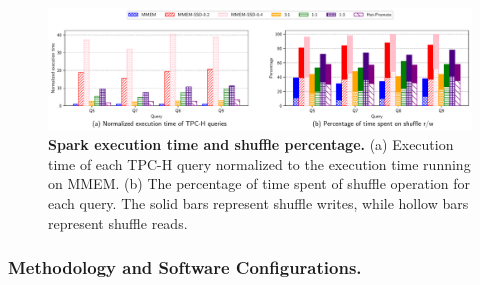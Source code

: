 \begin{figure}[t]
\centering
\includegraphics[width=1\textwidth]{fig/cxl/spark_cxl.pdf}
  \caption{\textbf{Spark execution time and shuffle percentage.} (a) Execution time of each TPC-H query normalized to the execution time running on MMEM. (b) The percentage of time spent of shuffle operation for each query. The solid bars represent shuffle writes, while hollow bars represent shuffle reads.}
\label{fig:eval_spark_1}
\end{figure}


\subsubsection{Methodology and Software Configurations.}

